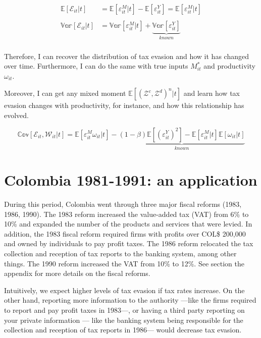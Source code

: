 \documentclass[
  12pt]{article}
\theoremstyle{definition}
\theoremstyle{remark}
\begin{document}
\[
\begin{aligned}
  \mathbb{E}[\mathcal E_{it}|t]&=\mathbb{E}[\varepsilon^M_{it}|t]-\mathbb{E}[\varepsilon^Y_{it}]=\mathbb{E}[\varepsilon^M_{it}|t] \\
  \\
  \mathbb{Var}[\mathcal E_{it}|t]&=\mathbb{Var}[\varepsilon^M_{it}|t]
  +\underbrace{\mathbb{Var}[\varepsilon^Y_{it}]}_{known}\\
\end{aligned}
\]

Therefore, I can recover the distribution of tax evasion and how it has
changed over time. Furthermore, I can do the same with true inputs
\(M_{it}^*\) and productivity \(\omega_{it}\).

Moreover, I can get any mixed moment
\(\mathbb{E}[(\mathcal{Z}^c, \mathcal{Z}^d)^n|t]\) and learn how tax
evasion changes with productivity, for instance, and how this
relationship has evolved.

\[
\mathbb{Cov}[\mathcal{E}_{it},\mathcal{W}_{it}|t]=\mathbb{E}[\varepsilon^M_{it}\omega_{it}|t]
-\underbrace{
(1-\beta)\mathbb{E}[(\varepsilon^{Y}_{it})^2]-\mathbb{E}[\varepsilon^M_{it}|t]\mathbb{E}[\omega_{it}|t]}_{
known
}
\]

\hypertarget{colombia-1981-1991-an-application}{%
\section{Colombia 1981-1991: an
application}\label{colombia-1981-1991-an-application}}

During this period, Colombia went through three major fiscal reforms
(1983, 1986, 1990). The 1983 reform increased the value-added tax (VAT)
from 6\% to 10\% and expanded the number of the products and services
that were levied. In addition, the 1983 fiscal reform required firms
with profits over COL\$ 200,000 and owned by individuals to pay profit
taxes. The 1986 reform relocated the tax collection and reception of tax
reports to the banking system, among other things. The 1990 reform
increased the VAT from 10\% to 12\%. See section the appendix for more
details on the fiscal reforms.

Intuitively, we expect higher levels of tax evasion if tax rates
increase. On the other hand, reporting more information to the authority
---like the firms required to report and pay profit taxes in 1983---, or
having a third party reporting on your private information --- like the
banking system being responsible for the collection and reception of tax
reports in 1986--- would decrease tax evasion.
\end{document}
